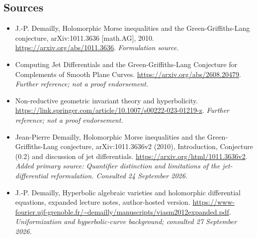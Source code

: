 \documentclass[11pt]{article}
\begin{document}
\subsection{Sources}
\begin{itemize}
\item[S1]J.-P. Demailly, Holomorphic Morse inequalities and the Green-Griffiths-Lang conjecture, arXiv:1011.3636 [math.AG], 2010.
\url{https://arxiv.org/abs/1011.3636}.
\textit{Formulation source.}
\item[S2]Computing Jet Differentials and the Green-Griffiths-Lang Conjecture for Complements of Smooth Plane Curves.
\url{https://arxiv.org/abs/2608.20479}.
\textit{Further reference; not a proof endorsement.}
\item[S3]Non-reductive geometric invariant theory and hyperbolicity.
\url{https://link.springer.com/article/10.1007/s00222-023-01219-z}.
\textit{Further reference; not a proof endorsement.}
\item[E1]Jean-Pierre Demailly, Holomorphic Morse inequalities and the Green-Griffiths-Lang conjecture, arXiv:1011.3636v2 (2010), Introduction, Conjecture (0.2) and discussion of jet differentials.
\url{https://arxiv.org/html/1011.3636v2}.
\textit{Added primary source: Quantifier distinction and limitations of the jet-differential reformulation. Consulted 24 September 2026.}
\item[E2]J.-P. Demailly, Hyperbolic algebraic varieties and holomorphic differential equations, expanded lecture notes, author-hosted version.
\url{https://www-fourier.ujf-grenoble.fr/~demailly/manuscripts/viasm2012expanded.pdf}.
\textit{Uniformization and hyperbolic-curve background; consulted 27 September 2026.}
\end{itemize}
\end{document}
